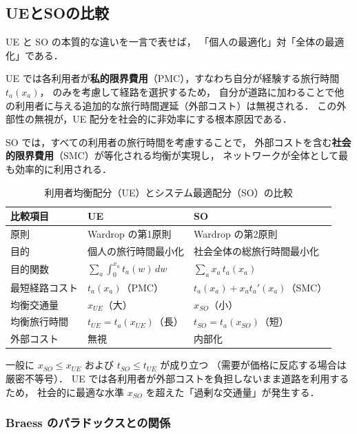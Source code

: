 \subsection{UEとSOの比較}
\label{subsec:ue-so-comparison}

UE と SO の本質的な違いを一言で表せば，
「個人の最適化」対「全体の最適化」である．

UE では各利用者が\textbf{私的限界費用}（PMC），すなわち自分が経験する旅行時間 $t_a(x_a)$，
のみを考慮して経路を選択するため，
自分が道路に加わることで他の利用者に与える追加的な旅行時間遅延（外部コスト）は無視される．
この外部性の無視が，UE 配分を社会的に非効率にする根本原因である．

SO では，すべての利用者の旅行時間を考慮することで，
外部コストを含む\textbf{社会的限界費用}（SMC）が等化される均衡が実現し，
ネットワークが全体として最も効率的に利用される．

\begin{table}[hbtp]
  \centering
  \caption{利用者均衡配分（UE）とシステム最適配分（SO）の比較}
  \label{tab:ue-so-comparison}
  \begin{tabular}{lll}
    \toprule
    比較項目 & UE & SO \\
    \midrule
    原則 & Wardrop の第1原則 & Wardrop の第2原則 \\
    目的 & 個人の旅行時間最小化 & 社会全体の総旅行時間最小化 \\
    目的関数 &
      $\displaystyle\sum_{a}\int_0^{x_a} t_a(w)\,dw$ &
      $\displaystyle\sum_{a} x_a\, t_a(x_a)$ \\[4pt]
    最短経路コスト & $t_a(x_a)$（PMC） & $t_a(x_a)+x_a t_a'(x_a)$（SMC） \\
    均衡交通量 & $x_{UE}$（大） & $x_{SO}$（小） \\
    均衡旅行時間 & $t_{UE} = t_a(x_{UE})$（長） & $t_{SO} = t_a(x_{SO})$（短） \\
    外部コスト & 無視 & 内部化 \\
    \bottomrule
  \end{tabular}
\end{table}

一般に $x_{SO} \leq x_{UE}$ および $t_{SO} \leq t_{UE}$ が成り立つ
（需要が価格に反応する場合は厳密不等号）．
UE では各利用者が外部コストを負担しないまま道路を利用するため，
社会的に最適な水準 $x_{SO}$ を超えた「過剰な交通量」が発生する．

\subsubsection*{Braess のパラドックスとの関係}

